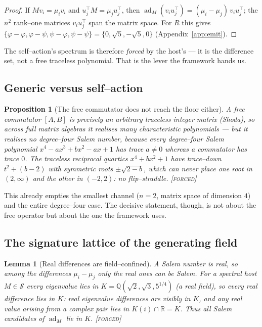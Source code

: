 \documentclass[11pt]{article}
\theoremstyle{plain}
\newtheorem{proposition}[theorem]{Proposition}
\newtheorem{lemma}[theorem]{Lemma}
\theoremstyle{definition}
\theoremstyle{remark}
\newcommand{\forced}{\textcolor{forcedc}{\textsc{[forced]}}}
\newcommand{\R}{\mathbb{R}}
\newcommand{\Q}{\mathbb{Q}}
\newcommand{\Scal}{\mathcal{S}}
\begin{document}
\begin{proof}
If $Mv_i=\mu_iv_i$ and $u_j^{\top}M=\mu_ju_j^{\top}$, then $\operatorname{ad}_M(v_iu_j^{\top})=(\mu_i-\mu_j)\,v_iu_j^{\top}$; the $n^2$ rank--one matrices $v_iu_j^{\top}$ span the matrix space. For $R$ this gives $\{\varphi-\varphi,\varphi-\psi,\psi-\varphi,\psi-\psi\}=\{0,\sqrt5,-\sqrt5,0\}$ (Appendix~\ref{app:emit}). \end{proof}

The self--action's spectrum is therefore \emph{forced} by the host's --- it is the difference set, not a free traceless polynomial. That is the lever the framework hands us.

\subsection{Generic versus self--action}\label{sec:genericvs}

\begin{proposition}[The free commutator does not reach the floor either]\label{prop:generic}
A free commutator $[A,B]$ is precisely an arbitrary traceless integer matrix (Shoda), so across full matrix algebras it realises many characteristic polynomials --- but it realises no \emph{degree--four} Salem number, because every degree--four Salem polynomial $x^4-ax^3+bx^2-ax+1$ has trace $a\ne0$ whereas a commutator has trace $0$. The traceless reciprocal quartics $x^4+bx^2+1$ have trace--down $t^2+(b-2)$ with \emph{symmetric} roots $\pm\sqrt{2-b}$, which can never place one root in $(2,\infty)$ and the other in $(-2,2)$: no flip--straddle. \forced
\end{proposition}

This already empties the smallest channel ($n=2$, matrix space of dimension $4$) and the entire degree--four case. The decisive statement, though, is not about the free operator but about the one the framework uses.

\subsection{The signature lattice of the generating field}\label{sec:siglattice}

\begin{lemma}[Real differences are field--confined]\label{lem:diffconf}
A Salem number is real, so among the differences $\mu_i-\mu_j$ only the \emph{real} ones can be Salem. For a spectral host $M\in\Scal$ every eigenvalue lies in $K=\Q(\sqrt2,\sqrt3,5^{1/4})$ (a real field), so every real difference lies in $K$: real eigenvalue differences are visibly in $K$, and any real value arising from a complex pair lies in $K(i)\cap\R=K$. Thus all Salem candidates of $\operatorname{ad}_M$ lie in $K$. \forced
\end{lemma}
\end{document}
